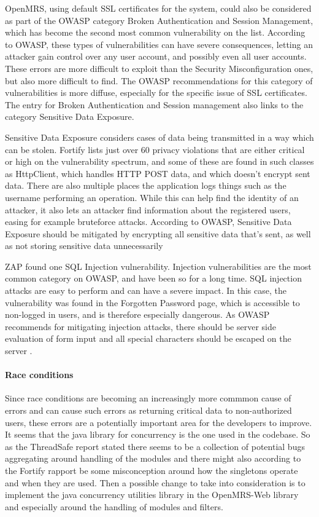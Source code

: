 \documentclass{report} %
\begin{document}
OpenMRS, using default SSL certificates for the system, could also be considered
as part of the OWASP category Broken Authentication and Session Management,
which has become the second most common vulnerability on the list. According to
OWASP, these types of vulnerabilities can have severe consequences, letting an
attacker gain control over any user account, and possibly even all user accounts.
These errors are more difficult to exploit than the Security Misconfiguration
ones, but also more difficult to find. The OWASP recommendations for this
category of vulnerabilities is more diffuse, especially for the specific issue
of SSL certificates. The entry for Broken Authentication and Session management
also links to the category Sensitive Data Exposure.

Sensitive Data Exposure considers cases of data being transmitted in a way which
can be stolen. Fortify lists just over 60 privacy violations that are either critical
or high on the vulnerability spectrum, and some of these are found in such
classes as HttpClient, which handles HTTP POST data, and which doesn't encrypt sent
data. There are also multiple places the application logs things such as the
username performing an operation. While this can help find the identity of
an attacker, it also lets an attacker find information about the registered
users, easing for example bruteforce attacks.
According to OWASP, Sensitive Data Exposure should be mitigated by encrypting
all sensitive data that's sent, as well as not storing sensitive data
unnecessarily

ZAP found one SQL Injection vulnerability. Injection vulnerabilities are the
most common category on OWASP, and have been so for a long time. SQL injection
attacks are easy to perform and can have a severe impact. In this case, the
vulnerability was found in the Forgotten Password page, which is accessible to
non-logged in users, and is therefore especially dangerous. As OWASP recommends
for mitigating injection attacks, there should be server side evaluation of form
input and all special characters should be escaped on the server \autocite[]{owasptop10}.


\paragraph{Race conditions}
Since race conditions are becoming an increasingly
more commmon cause of errors and can cause such errors as returning critical
data to non-authorized users, these errors are a potentially important area for
the developers to improve. It seems that the java library for concurrency is the
one used in the codebase. So as the ThreadSafe report stated there seems to be
a collection of potential bugs aggregating around handling of the modules and
there might also according to the Fortify rapport be some misconception around
how the singletons operate and when they are used. Then a possible change to take
into consideration is to implement the java concurrency utilities library in the
OpenMRS-Web library and especially around the handling of modules and filters. 
\end{document}
